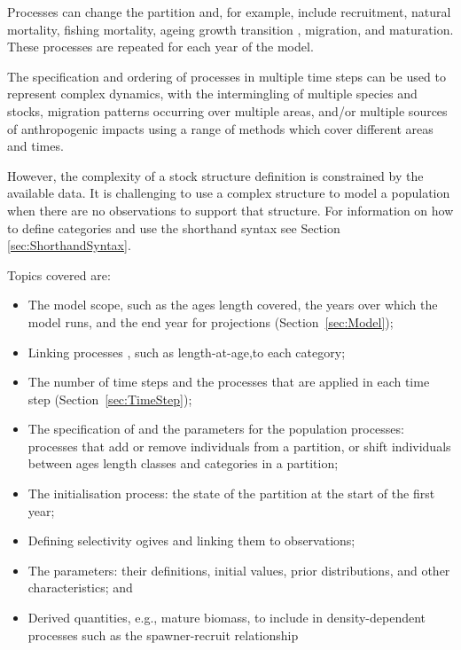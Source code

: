 Processes can change the partition and, for example, include recruitment, natural mortality, fishing mortality, \ifAgeBased ageing \else growth transition \fi, migration, and maturation. These processes are repeated for each year of the model.

The specification and ordering of processes in multiple time steps can be used to represent complex dynamics, with the intermingling of multiple species and stocks, migration patterns occurring over multiple areas, and/or multiple sources of anthropogenic impacts using a range of methods which cover different areas and times.

However, the complexity of a stock structure definition is constrained by the available data. It is challenging to use a complex structure to model a population when there are no observations to support that structure.  For information on how to define categories and use the shorthand syntax see Section \ref{sec:ShorthandSyntax}.

Topics covered are:

\begin{itemize}
	\item The model scope, such as the \ifAgeBased ages \else length \fi covered, the years over which the model runs, and the end year for projections (Section~\ref{sec:Model});
	\item Linking processes \ifAgeBased, such as length-at-age,\fi to each category;
	\item The number of time steps and the processes that are applied in each time step (Section~\ref{sec:TimeStep});
	\item The specification of and the parameters for the population processes: processes that add or remove individuals from a partition, or shift individuals between \ifAgeBased ages \else length classes \fi and categories in a partition;
	\item The initialisation process: the state of the partition at the start of the first year;
	\item Defining selectivity ogives and linking them to observations;
	\item The parameters: their definitions, initial values, prior distributions, and other characteristics; and
	\item Derived quantities, e.g., mature biomass, to include in density-dependent processes such as the spawner-recruit relationship
\end{itemize}

